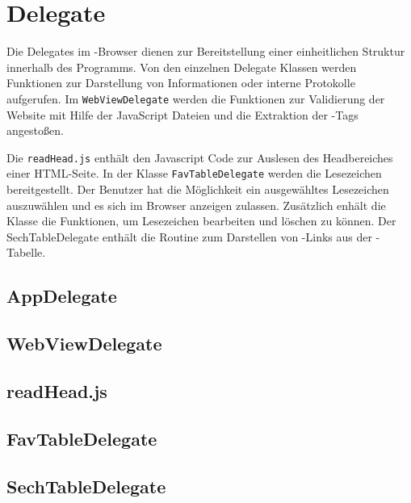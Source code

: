 
\section{Delegate}

Die Delegates im \SECH-Browser dienen zur Bereitstellung einer einheitlichen Struktur innerhalb des Programms. Von den einzelnen Delegate Klassen werden Funktionen zur Darstellung von Informationen oder interne Protokolle aufgerufen. Im \lstinline|WebViewDelegate| werden die Funktionen zur Validierung der Website mit Hilfe der JavaScript Dateien und die Extraktion der \SEARCH-Tags angestoßen.

Die \lstinline|readHead.js| enthält den Javascript Code zur Auslesen des Headbereiches einer HTML-Seite. In der Klasse \lstinline|FavTableDelegate| werden die Lesezeichen bereitgestellt. Der Benutzer hat die Möglichkeit ein ausgewähltes Lesezeichen auszuwählen und es sich im Browser anzeigen zulassen. Zusätzlich enhält die Klasse die Funktionen, um Lesezeichen bearbeiten und löschen zu können. Der SechTableDelegate enthält die Routine zum Darstellen von \SEARCH-Links aus der \SECH-Tabelle. 
\subsection{AppDelegate}
\subsection{WebViewDelegate}
\subsection{readHead.js}
\subsection{FavTableDelegate}
\subsection{SechTableDelegate}

